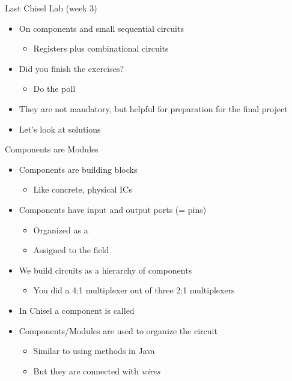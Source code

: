 \begin{frame}[fragile]{Last Chisel Lab (week 3)}
\begin{itemize}
\item On components and small sequential circuits
\begin{itemize}
\item Registers plus combinational circuits
\end{itemize}
\item Did you finish the exercises?
\begin{itemize}
\item Do the poll
\end{itemize}
\item They are not mandatory, but helpful for preparation for the final project
\item Let's look at solutions
\end{itemize}
\end{frame}

\begin{frame}[fragile]{Components are Modules}
\begin{itemize}
\item Components are building blocks
\begin{itemize}
\item Like concrete, physical ICs
\end{itemize}
\item Components have input and output ports (= pins)
\begin{itemize}
\item Organized as a 
\item Assigned to the field 
\end{itemize}
\item We build circuits as a hierarchy of components
\begin{itemize}
\item You did a 4:1 multiplexer out of three 2:1 multiplexers
\end{itemize}
\item In Chisel a component is called 
\item Components/Modules are used to organize the circuit
\begin{itemize}
\item Similar to using methods in Java
\item But they are connected with \emph{wires}
\end{itemize}
\end{itemize}
\end{frame}


